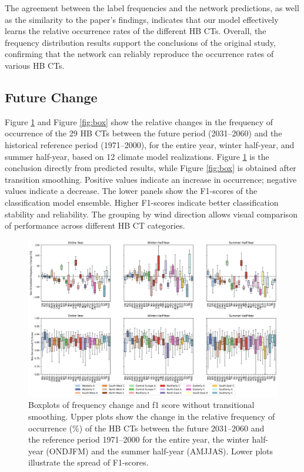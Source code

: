 \documentclass[
]{krantz}
\begin{document}
The agreement between the label frequencies and the network predictions, as well as the similarity to the paper's findings, indicates that our model effectively learns the relative occurrence rates of the different HB CTs.
Overall, the frequency distribution results support the conclusions of the original study, confirming that the network can reliably reproduce the occurrence rates of various HB CTs.

\subsection{Future Change}\label{future-change}

Figure \ref{fig:boxn} and Figure \ref{fig:box} show the relative changes in the frequency of occurrence of the 29 HB CTs between the future period (2031--2060) and the historical reference period (1971--2000), for the entire year, winter half-year, and summer half-year, based on 12 climate model realizations.
Figure \ref{fig:boxn} is the conclusion directly from predicted results, while Figure \ref{fig:box} is obtained after transition smoothing.
Positive values indicate an increase in occurrence; negative values indicate a decrease.
The lower panels show the F1-scores of the classification model ensemble.
Higher F1-scores indicate better classification stability and reliability.
The grouping by wind direction allows visual comparison of performance across different HB CT categories.

\begin{figure}

{\centering \includegraphics[width=0.7\linewidth]{work/01-weatherpattern/figures/non_s_combined_boxplot} 

}

\caption{Boxplots of frequency change and f1 score without transitional smoothing. Upper plots show the change in the relative frequency of occurrence (\%) of the HB CTs between the future 2031–2060 and the reference period 1971–2000 for the entire year, the winter half-year (ONDJFM) and the summer half-year (AMJJAS).  Lower plots illustrate the spread of F1-scores.}\label{fig:boxn}
\end{figure}
\end{document}
